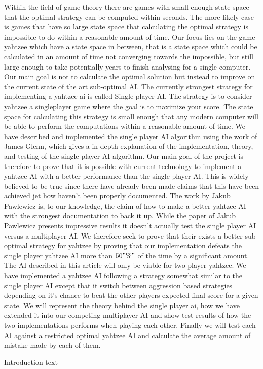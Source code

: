 Within the field of game theory there are games with small enough state space that the optimal strategy can be computed within seconds. The more likely case is games that have so large state space that calculating the optimal strategy is impossible to do within a reasonable amount of time. Our focus lies on the game yahtzee which have a state space in between, that is a state space which could be calculated in an amount of time not converging towards the impossible, but still large enough to take potentially years to finish analysing for a single computer. Our main goal is not to calculate the optimal solution but instead to improve on the current state of the art sub-optimal AI. The currently strongest strategy for implementing a yahtzee ai is called Single player AI. The strategy is to consider yahtzee a singleplayer game where the goal is to maximize your score. The state space for calculating this strategy is small enough that any modern computer will be able to perform the computations within a reasonable amount of time. We have described and implemented the single player AI algorithm using the work of James Glenn\cite{glenn2006optimal}, which gives a in depth explanation of the implementation, theory, and testing of the single player AI algorithm.\newline \hspace*{20px} Our main goal of the project is therefore to prove that it is possible with current technology to implement a yahtzee AI with a better performance than the single player AI. This is widely believed to be true since there have already been made claims that this have been achieved jet how haven't been properly documented. The work by Jakub Pawlewicz is, to our knowledge, the claim of how to make a  better yahtzee AI with the strongest documentation to back it up. While the paper of Jakub Pawlewicz presents impressive results it doesn't actually test the single player AI versus a multiplayer AI. We therefore seek to prove that their exists a better sub-optimal strategy for yahtzee by proving that our implementation defeats the single player yahtzee AI more than $50"\%" $ of the time by a significant amount. The AI described in this article will only be viable for two player yahtzee.\newline \hspace*{20px} We have implemented a yahtzee AI following a strategy somewhat similar to the single player AI except that it switch between aggression based strategies depending on it's chance to beat the other players expected final score for a given state. We will represent the theory behind the single player ai, how we have extended it into our competing multiplayer AI and show test results of how the two implementations performs when playing each other. Finally we will test each AI against a restricted optimal yahtzee AI and calculate the average amount of mistake made by each of them.

Introduction text
